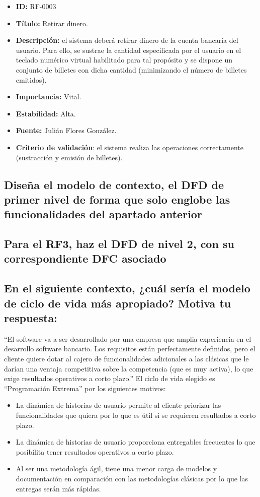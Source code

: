 \begin{itemize}
    \item \textbf{ID:} RF-0003
    \item \textbf{Título:} Retirar dinero.
    \item \textbf{Descripción:} el sistema deberá retirar dinero de la cuenta bancaria del usuario. Para ello, se sustrae la cantidad especificada por el usuario en el teclado numérico virtual habilitado para tal propósito y se dispone un conjunto de billetes con dicha cantidad (minimizando el número de billetes emitidos).
    \item \textbf{Importancia:} Vital.
    \item \textbf{Estabilidad:} Alta.
    \item \textbf{Fuente:} Julián Flores González.
    \item \textbf{Criterio de validación}: el sistema realiza las operaciones correctamente (sustracción y emisión de billetes).
\end{itemize}

\subsection{Diseña el modelo de contexto, el DFD de primer nivel de forma que solo englobe las funcionalidades del apartado anterior}

\subsection{Para el RF3, haz el DFD de nivel 2, con su correspondiente DFC asociado}

\subsection{En el siguiente contexto, ¿cuál sería el modelo de ciclo de vida más apropiado? Motiva tu respuesta:}
``El software va a ser desarrollado por una empresa que amplia experiencia en el desarrollo software bancario. Los requisitos están perfectamente definidos, pero el cliente quiere dotar al cajero de funcionalidades adicionales a las clásicas que le darían una ventaja competitiva sobre la competencia (que es muy activa), lo que exige resultados operativos a corto plazo.''
El ciclo de vida elegido es ``Programación Extrema'' por los siguientes motivos:
\begin{itemize}
    \item La dinámica de historias de usuario permite al cliente priorizar las funcionalidades que quiera por lo que es útil si se requieren resultados a corto plazo.
    \item La dinámica de historias de usuario proporciona entregables frecuentes lo que posibilita tener resultados operativos a corto plazo.
    \item Al ser una metodología ágil, tiene una menor carga de modelos y documentación en comparación con las metodologías clásicas por lo que las entregas serán más rápidas.
\end{itemize}

